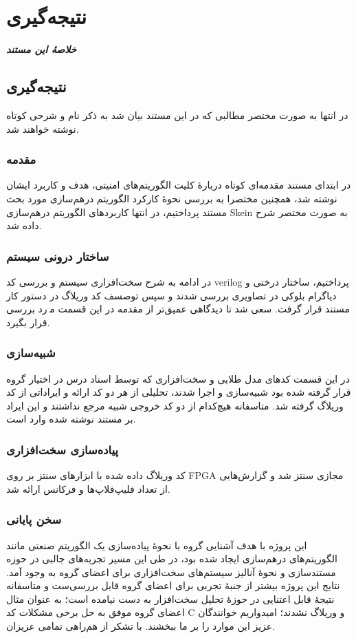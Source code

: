 \chapter{نتیجه‌گیری}
\noindent
\textbf{
	\textit{
	خلاصهٔ این مستند
	}
}
\pagebreak

\section{نتیجه‌گیری}
در انتها به صورت مختصر مطالبی که در این مستند بیان شد به ذکر نام و شرحی کوتاه نوشته خواهند شد.
\subsection{مقدمه}
در ابتدای مستند مقدمه‌ای کوتاه دربارهٔ کلیت الگوریتم‌های امنیتی، هدف و کاربرد ایشان نوشته شد، همچنین مختصرا به بررسی نحوهٔ کارکرد الگوریتم درهم‌سازی مورد بحث مستند پرداختیم، در انتها کاربردهای الگوریتم درهم‌سازی Skein به صورت مختصر شرح داده شد. 

\subsection{ساختار درونی سیستم}
در ادامه به شرح سخت‌افزاری سیستم و بررسی کد verilog پرداختیم، ساختار درختی و دیاگرام بلوکی در تصاویری بررسی شدند و سپس توصسف کد وریلاگ در دستور کار مستند قرار گرفت. سعی شد تا دیدگاهی عمیق‌تر از مقدمه در این قسمت موٖرد بررسی قرار بگیرد. 

\subsection{شبیه‌سازی}
در این قسمت کدهای مدل طلایی و سخت‌افزاری که توسط استاد درس در اختیار گروه قرار گرفته شده بود شبیه‌سازی و اجرا شدند، تحلیلی از هر دو کد ارائه و ایراداتی از کد وریلاگ گرفته شد. 
متاسفانه هیچ‌کدام از دو کد خروجی شبیه مرجع نداشتند و این ایراد بر مستند نوشته شده وارد است. 

\subsection{پیاده‌سازی سخت‌افزاری}
کد وریلاگ داده شده با ابزارهای سنتز بر روی FPGA مجازی سنتز شد و گزارش‌هایی از تعداد فلیپ‌فلاپ‌ها و فرکانس ارائه شد. 


\subsection{سخن پایانی}
این پروژه با هدف آشنایی گروه با نحوهٔ پیاده‌سازی یک الگوریتم صنعتی مانند الگوریتم‌های درهم‌سازی ایجاد شده بود، در طی این مسیر تجربه‌های جالبی در حوزه مستند‌سازی و نحوهٔ آنالیز سیستم‌های سخت‌افزاری برای اعضای گروه به وجود آمد. نتایج این پروژه بیشتر از جنبهٔ تجربی برای اعضای گروه قابل بررسی‌ست و متاسفانه نتیجهٔ قابل اعتنایی در حوزهٔ تحلیل سخت‌افزار به دست نیامده است؛ به عنوان مثال اعضای گروه موفق به حل برخی مشکلات کد C و وریلاگ نشدند؛ امیدواریم خوانندگان عزیز این موارد را بر ما ببخشند. با تشکر از هم‌راهی تمامی عزیزان. 